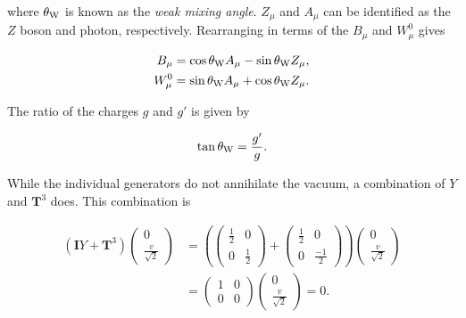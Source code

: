 \documentclass{article}
\begin{document}
where $\theta_{\rm{W}}$ is known as the \textit{weak mixing angle}. $Z_\mu$ and $A_\mu$ can be identified as the $Z$ boson and photon, respectively. Rearranging in terms of the $B_\mu$ and $W^{0}_\mu$ gives

\begin{equation}
\begin{split}
B_\mu & = \cos\theta_{\rm{W}} A_\mu - \sin\theta_{\rm{W}}Z_\mu, \\
W^{0}_\mu & = \sin\theta_{\rm{W}} A_\mu + \cos\theta_{\rm{W}}Z_\mu. \\
\end{split}
\end{equation}

The ratio of the charges $g$ and $g'$ is given by 

\begin{equation}
\tan\theta_{\rm{W}} = \frac{g'}{g}.
\end{equation}

While the individual generators do not annihilate the vacuum, a combination of $Y$ and $\bm{T}^{3}$ does. This combination is 

\begin{equation}
\begin{split}
\left( \bm{I}Y + \bm{T}^3 \right)\left(\begin{matrix}0 \\ \frac{v}{\sqrt{2}} \end{matrix}\right) & = \left(\left(\begin{matrix} \frac{1}{2} & 0 \\ 0 & \frac{1}{2} \end{matrix}\right) + \left(\begin{matrix}\frac{1}{2} & 0 \\ 0 & \frac{-1}{2}\end{matrix}\right)\right)\left(\begin{matrix}0 \\ \frac{v}{\sqrt{2}}\end{matrix}\right) \\
& = \left( \begin{matrix} 1 & 0 \\ 0 & 0 \end{matrix} \right)\left(\begin{matrix}0\\            \frac{v}{\sqrt{2}}\end{matrix} \right) = 0.
\end{split}
\end{equation}
\end{document}
